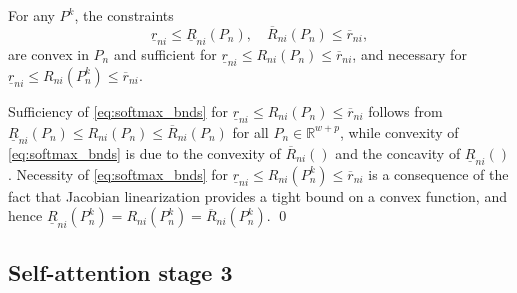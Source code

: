 \documentclass{ifacconf}
\DeclareMathOperator{\LSE}{LSE}
\begin{document}
\begin{thm}
For any $P^k$, the constraints
\begin{equation}\label{eq:softmax_bnds}
\underline{r}_{ni} \leq \underline{R}_{ni}(P_n), 
\quad
\overline{R}_{ni}(P_n) \leq \overline{r}_{ni},
\end{equation}
are convex in $P_n$ and sufficient for $\underline{r}_{ni} \leq R_{ni}(P_n) \leq \overline{r}_{ni}$, and necessary for $\underline{r}_{ni} \leq R_{ni}(P_n^k) \leq \overline{r}_{ni}$.
\end{thm}

\begin{pf}
Sufficiency of \eqref{eq:softmax_bnds} for $\underline{r}_{ni} \leq R_{ni}(P_n) \leq \overline{r}_{ni}$ 
follows from $\underline{R}_{ni}(P_{n}) \leq R_{ni}(P_n)\leq \overline{R}_{ni}(P_{n})$ for all $P_n\in \mathbb{R}^{w+p}$,
while convexity of \eqref{eq:softmax_bnds} 
is due to the convexity of $\overline{R}_{ni}()$ and the concavity of $\underline{R}_{ni}()$.
Necessity of \eqref{eq:softmax_bnds} for $\underline{r}_{ni} \leq R_{ni}(P_n^k) \leq \overline{r}_{ni}$ is a consequence of the fact that Jacobian linearization provides a tight bound on a convex function, and hence $\underline{R}_{ni}(P_n^k)=R_{ni}(P_n^k)=\overline{R}_{ni}(P_n^k)$.
\qed\end{pf}

\subsection{Self-attention stage 3}\label{sec:stage3}
\end{document}
